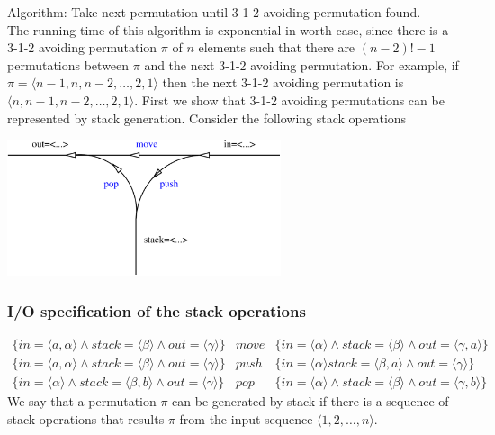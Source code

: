 Algorithm: Take next permutation until 3-1-2 avoiding permutation found.\\
The running time of this algorithm is exponential in worth case, since there is a 3-1-2 avoiding permutation $\pi$ of $n$ elements such that there are $(n-2)!-1$ permutations between $\pi$ and the next 3-1-2 avoiding permutation. For example, if $\pi=\langle n-1,n,n-2,\ldots, 2,1 \rangle$ then the next 3-1-2 avoiding permutation is $\langle n,n-1,n-2,\ldots , 2,1 \rangle$.
First we show that 3-1-2 avoiding permutations can be represented by stack generation. Consider the following stack operations\\
\begin{center}
\includegraphics[height=4cm]{img/vasut.pdf}
\end{center}
\subsubsection*{I/O specification of the stack operations}
\begin{eqnarray}
\{in=\langle a,\alpha \rangle \wedge  stack=\langle \beta \rangle \wedge  out=\langle \gamma \rangle\} & move & \{ in=\langle \alpha\rangle \wedge  stack=\langle\beta \rangle \wedge  out=\langle \gamma,a \rangle\}\\
\{ in=\langle a,\alpha \rangle \wedge  stack=\langle \beta \rangle \wedge  out=\langle\gamma \rangle\} & push & \{ in=\langle\alpha \rangle stack=\langle \beta,a \rangle \wedge  out=\langle\gamma  \rangle\}\\
\{ in=\langle \alpha \rangle \wedge  stack=\langle\beta,b \rangle \wedge  out=\langle\gamma \rangle\} & pop & \{ in=\langle\alpha \rangle \wedge  stack=\langle\beta \rangle \wedge out=\langle \gamma,b \rangle  \}
\end{eqnarray}
We say that a permutation $\pi$ can be generated by stack if there is a sequence of stack operations that results $\pi$ from the input sequence $\langle1,2, \ldots , n \rangle$.
